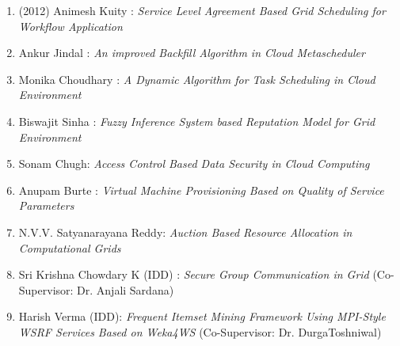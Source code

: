 \begin{itemize}
\begin{enumerate} %
\item	(2012) Animesh Kuity : \textit{Service Level Agreement Based Grid Scheduling for Workflow Application}
\item	Ankur Jindal : \textit{An improved Backfill Algorithm in Cloud Metascheduler}
\item	Monika Choudhary : \textit{A Dynamic Algorithm for Task Scheduling in Cloud Environment}	
\item	Biswajit Sinha : \textit{Fuzzy Inference System based Reputation Model for Grid Environment} 
\item	Sonam Chugh: \textit{Access Control Based Data Security in Cloud Computing} 
\item	Anupam Burte : \textit{Virtual Machine Provisioning Based on Quality of Service Parameters}	
\item	N.V.V. Satyanarayana Reddy: \textit{Auction Based Resource Allocation in Computational Grids	} 
\item   Sri Krishna Chowdary K (IDD) : \textit{Secure Group Communication in Grid}  (Co-Supervisor: Dr. Anjali Sardana) 
\item	Harish Verma (IDD): \textit{Frequent Itemset Mining Framework Using MPI-Style WSRF Services Based on Weka4WS} (Co-Supervisor: Dr. DurgaToshniwal)







\end{enumerate}
\end{itemize}
